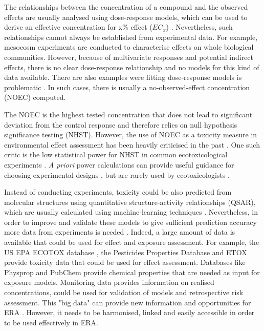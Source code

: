 The relationships between the concentration of a compound and the observed effects are usually analysed using dose-response models, which can be used to derive an effective concentration for x\% effect ($EC_{x}$) \citep{ritz_toward_2010}. 
Nevertheless, such relationships cannot always be established from experimental data.
For example, mesocosm experiments are conducted to characterise effects on whole biological communities.
However, because of multivariate responses and potential indirect effects, there is no clear dose-response relationship and no models for this kind of data available. 
There are also examples were fitting dose-response models is problematic \citep{green_issues_2016}. 
In such cases, there is usually a no-observed-effect concentration (NOEC) computed. 

The NOEC is the highest tested concentration that does not lead to significant deviation from the control response and therefore relies on null hypothesis significance testing (NHST). 
However, the use of NOEC as a toxicity measure in environmental effect assessment has been heavily criticised in the past \citep{laskowski_good_1995, chapman_warning:_1996, warne_noec_2008, fox_what_2012, jager_bad_2012, fox_dont_2016}. 
One such critic is the low statistical power for NHST in common ecotoxicological experiments \citep{van_der_hoeven_power_1998}.
\emph{A priori} power calculations can provide useful guidance for choosing experimental designs \citep{johnson_power_2015}, but are rarely used by ecotoxicologists \citep{newman_what_2008}. 

Instead of conducting experiments, toxicity could be also predicted from molecular structures using quantitative structure-activity relationships (QSAR), which are usually calculated using machine-learning techniques \citep{murrell_chemically_2015, cortes-ciriano_bioalerts:_2016}. 
Nevertheless, in order to improve and validate these models to give sufficient prediction accuracy more data from experiments is needed \citep{kuhne_read-across_2013}. 
Indeed, a large amount of data is available that could be used for effect and exposure assessment. 
For example, the US EPA ECOTOX database \citep{u.s._epa_ecotoxicology_2016}, the Pesticides Properties Database \citep{lewis_international_2016} and ETOX \citep{umweltbundesamt_etox:_2016} provide toxicity data that could be used for effect assessment.
Databases like Physprop \citep{howard_physical_2016} and PubChem \citep{kim_pubchem_2016} provide chemical properties that are needed as input for exposure models.
Monitoring data provides information on realised concentrations, could be used for validation of models and retrospective risk assessment.
This "big data" can provide new information and opportunities for ERA \citep{dafforn_big_2015}. 
However, it needs to be harmonised, linked and easily accessible in order to be used effectively in ERA.



